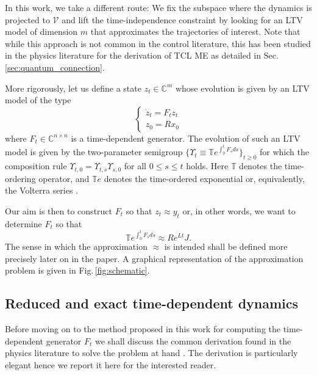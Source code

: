 \documentclass[twocolumn]{autart}    %
\newcommand{\Vs}{\mathscr{V}}
\newcommand{\Cb}{\mathbb{C}}
\newcommand{\Tb}{\mathbb{T}}
\begin{document}
In this work, we take a different route: We fix the subspace where the dynamics is projected to $\Vs$ and lift the time-independence constraint by looking for an LTV model of dimension $m$ that approximates the trajectories of interest. Note that while this approach is not common in the control literature, this has been studied in the physics literature for the derivation of TCL ME as detailed in Sec. \ref{sec:quantum_connection}.

More rigorously, let us define a state $z_t\in\Cb^m$ whose evolution is given by an LTV model of the type
 \begin{equation}
    \begin{cases}
        \dot{z}_t = F_t z_t\\
        z_0 = R x_0
    \end{cases}
 \end{equation}
 where $F_t\in\Cb^{n\times n}$ is a time-dependent generator. The evolution of such an LTV model is given by the two-parameter semigroup $\{\Upsilon_t \equiv \Tb e^{\int_0^t F_s ds} \}_{t\geq0}$ for which the composition rule $\Upsilon_{t,0}=\Upsilon_{t,s}\Upsilon_{s,0}$ for all $0\leq s\leq t$ holds. Here $\Tb$ denotes the time-ordering operator, and $\Tb e$ denotes the time-ordered exponential or, equivalently, the Volterra series \cite{lawrence1979volterra,Giscard_2015}.  

Our aim is then to construct $F_t$ so that $z_t\approx y_t$ or, in other words, we want to determine $F_t$ so that \[\Tb e^{\int_0^t F_s ds} \approx R e^{L t} J.\] The sense in which the approximation $\approx$ is intended shall be defined more precisely later on in the paper. A graphical representation of the approximation problem is given in Fig.\,\ref{fig:schematic}.   

\subsection{Reduced and exact time-dependent dynamics}

Before moving on to the method proposed in this work for computing the time-dependent generator $F_t$ we shall discuss the common derivation found in the physics literature to solve the problem at hand \cite{Tokieda_2025,chaturvedi_time-convolutionless_1979,nestmann_time-convolutionless_2019,shibata_generalized_1977}. The derivation is particularly elegant hence we report it here for the interested reader. 
\end{document}
